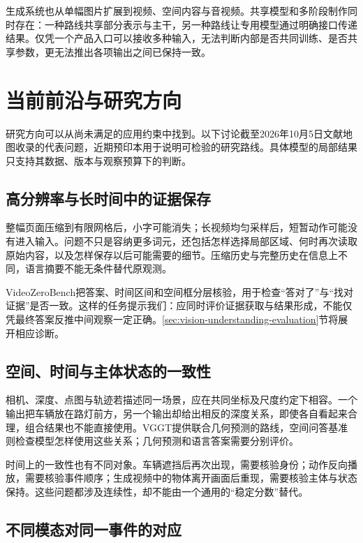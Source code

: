 生成系统也从单幅图片扩展到视频、空间内容与音视频。共享模型和多阶段制作同时存在：一种路线共享部分表示与主干，另一种路线让专用模型通过明确接口传递结果。仅凭一个产品入口可以接收多种输入，无法判断内部是否共同训练、是否共享参数，更无法推出各项输出之间已保持一致。

\section{当前前沿与研究方向}
\label{sec:vision-overview-frontiers}

研究方向可以从尚未满足的应用约束中找到。以下讨论截至2026年10月5日文献地图收录的代表问题，近期预印本用于说明可检验的研究路线。具体模型的局部结果只支持其数据、版本与观察预算下的判断。

\subsection{高分辨率与长时间中的证据保存}
\label{sec:vision-overview-evidence-frontier}

整幅页面压缩到有限网格后，小字可能消失；长视频均匀采样后，短暂动作可能没有进入输入。问题不只是容纳更多词元，还包括怎样选择局部区域、何时再次读取原始内容，以及怎样保存以后可能需要的细节。压缩历史与完整历史在信息上不同，语言摘要不能无条件替代原观测。

VideoZeroBench把答案、时间区间和空间框分层核验，用于检查“答对了”与“找对证据”是否一致。这样的任务提示我们：应同时评价证据获取与结果形成，不能仅凭最终答案反推中间观察一定正确。\ref{sec:vision-understanding-evaluation}节将展开相应诊断。

\subsection{空间、时间与主体状态的一致性}
\label{sec:vision-overview-consistency-frontier}

相机、深度、点图与轨迹若描述同一场景，应在共同坐标及尺度约定下相容。一个输出把车辆放在路灯前方，另一个输出却给出相反的深度关系，即使各自看起来合理，组合结果也不能直接使用。VGGT提供联合几何预测的路线，空间问答基准则检查模型怎样使用这些关系；几何预测和语言答案需要分别评价。

时间上的一致性也有不同对象。车辆遮挡后再次出现，需要核验身份；动作反向播放，需要核验事件顺序；生成视频中的物体离开画面后重现，需要核验主体与状态保持。这些问题都涉及连续性，却不能由一个通用的“稳定分数”替代。

\subsection{不同模态对同一事件的对应}
\label{sec:vision-overview-alignment-frontier}

